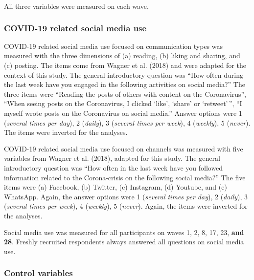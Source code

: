 \documentclass[
  man,mask]{apa7}
\begin{document}
All three variables were measured on each wave.

\hypertarget{covid-19-related-social-media-use}{%
\subsubsection{COVID-19 related social media use}\label{covid-19-related-social-media-use}}

COVID-19 related social media use focused on communication types was measured with the three dimensions of (a) reading, (b) liking and sharing, and (c) posting.
The items come from Wagner et al. (2018) and were adapted for the context of this study.
The general introductory question was ``How often during the last week have you engaged in the following activities on social media?''
The three items were ``Reading the posts of others with content on the Coronavirus'', ``When seeing posts on the Coronavirus, I clicked `like', `share' or `retweet'\,'', ``I myself wrote posts on the Coronavirus on social media.''
Answer options were 1 (\emph{several times per day}), 2 (\emph{daily}), 3 (\emph{several times per week}), 4 (\emph{weekly}), 5 (\emph{never}).
The items were inverted for the analyses.

COVID-19 related social media use focused on channels was measured with five variables from Wagner et al. (2018), adapted for this study.
The general introductory question was ``How often in the last week have you followed information related to the Corona-crisis on the following social media?''
The five items were (a) Facebook, (b) Twitter, (c) Instagram, (d) Youtube, and (e) WhatsApp.
Again, the answer options were 1 (\emph{several times per day}), 2 (\emph{daily}), 3 (\emph{several times per week}), 4 (\emph{weekly}), 5 (\emph{never}).
Again, the items were inverted for the analyses.

Social media use was measured for all participants on waves 1, 2, 8, 17, 23, \textbf{and 28}.
Freshly recruited respondents always answered all questions on social media use.

\hypertarget{control-variables}{%
\subsubsection{Control variables}\label{control-variables}}
\end{document}
